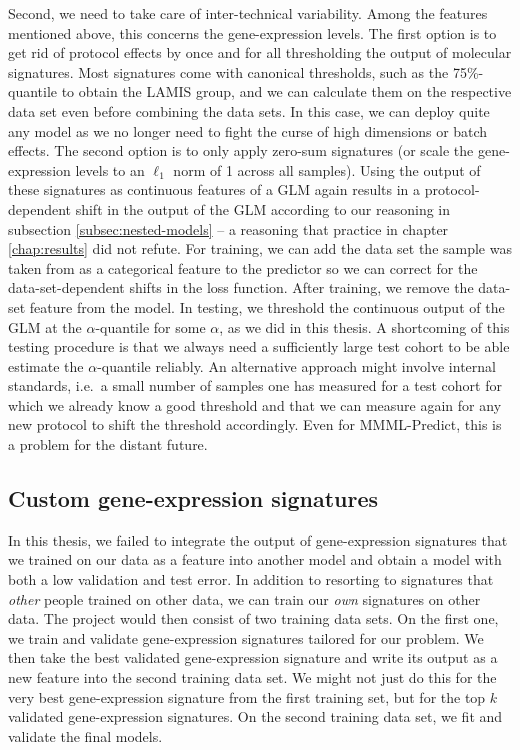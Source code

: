 Second, we need to take care of inter-technical variability. Among the features mentioned above, this concerns 
the gene-expression levels. The first option is to get rid of protocol effects by once and for all
thresholding the output of molecular signatures. Most signatures come with canonical thresholds, 
such as the \num{75}\%-quantile to obtain the LAMIS group, and we can calculate them on the 
respective data set even before combining the data sets. In this case, we can deploy quite any model as we no 
longer need to fight the curse of high dimensions or batch effects. The second option is to only 
apply zero-sum signatures (or scale the gene-expression levels to an $\ell_1$ norm of \num{1} 
across all samples). Using the output of these signatures as continuous features of a GLM again 
results in a protocol-dependent shift in the output of the GLM according to our reasoning in subsection 
\ref{subsec:nested-models} -- a reasoning that practice in chapter \ref{chap:results} did not refute. 
For training, we can add the data set the sample was taken from as a categorical feature to the 
predictor so we can correct for the data-set-dependent shifts in the loss function. 
After training, we remove the data-set feature from the model. In testing, 
we threshold the continuous output of the GLM at the $\alpha$-quantile for some $\alpha$, as we did 
in this thesis. A shortcoming of this testing procedure is that we always need a sufficiently large 
test cohort to be able estimate the $\alpha$-quantile reliably. An alternative approach might 
involve internal standards, i.e.\ a small number of samples one has measured for a test cohort for 
which we already know a good threshold and that we can measure again for any new protocol to shift 
the threshold accordingly. Even for MMML-Predict, this is a problem for the distant future.

\subsection{Custom gene-expression signatures}

In this thesis, we failed to integrate the output of gene-expression signatures that we trained 
on our data as a feature into another model and obtain a model with both a low validation and test 
error. In addition to resorting to signatures that \textit{other} people trained on other data, we can train 
our \textit{own} signatures on other data. The project would then consist of two training data 
sets. On the first one, we train and validate gene-expression signatures tailored for our problem.
We then take the best validated gene-expression signature and write its output as a new feature into the 
second training data set. We might not just do this for the very best gene-expression signature 
from the first training set, but for the top $k$ validated gene-expression signatures. On the second 
training data set, we fit and validate the final models.

